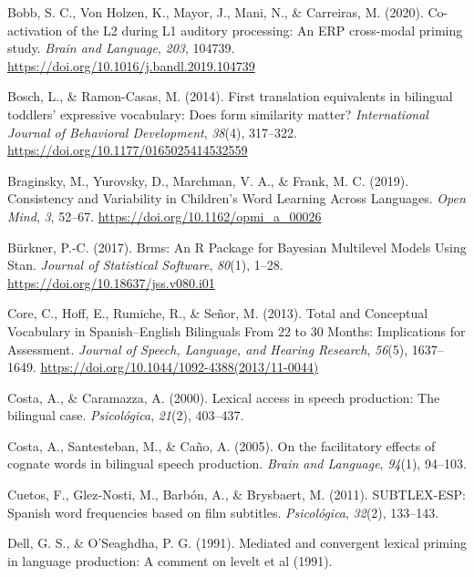 \documentclass[
  english,
  man,man,floatsintext]{apa6}
\newlength{\cslhangindent}
\newenvironment{cslreferences}%
  {\setlength{\parindent}{0pt}%
  \everypar{\setlength{\hangindent}{\cslhangindent}}\ignorespaces}%
  {\par}
\begin{document}
\begin{cslreferences}
\leavevmode\hypertarget{ref-bobb_co-activation_2020}{}%
Bobb, S. C., Von Holzen, K., Mayor, J., Mani, N., \& Carreiras, M. (2020). Co-activation of the L2 during L1 auditory processing: An ERP cross-modal priming study. \emph{Brain and Language}, \emph{203}, 104739. \url{https://doi.org/10.1016/j.bandl.2019.104739}

\leavevmode\hypertarget{ref-bosch_first_2014}{}%
Bosch, L., \& Ramon-Casas, M. (2014). First translation equivalents in bilingual toddlers' expressive vocabulary: Does form similarity matter? \emph{International Journal of Behavioral Development}, \emph{38}(4), 317--322. \url{https://doi.org/10.1177/0165025414532559}

\leavevmode\hypertarget{ref-braginsky_consistency_2019}{}%
Braginsky, M., Yurovsky, D., Marchman, V. A., \& Frank, M. C. (2019). Consistency and Variability in Children's Word Learning Across Languages. \emph{Open Mind}, \emph{3}, 52--67. \url{https://doi.org/10.1162/opmi_a_00026}

\leavevmode\hypertarget{ref-burkner_brms_2017}{}%
Bürkner, P.-C. (2017). Brms: An R Package for Bayesian Multilevel Models Using Stan. \emph{Journal of Statistical Software}, \emph{80}(1), 1--28. \url{https://doi.org/10.18637/jss.v080.i01}

\leavevmode\hypertarget{ref-core_total_2013}{}%
Core, C., Hoff, E., Rumiche, R., \& Señor, M. (2013). Total and Conceptual Vocabulary in Spanish--English Bilinguals From 22 to 30 Months: Implications for Assessment. \emph{Journal of Speech, Language, and Hearing Research}, \emph{56}(5), 1637--1649. \url{https://doi.org/10.1044/1092-4388(2013/11-0044)}

\leavevmode\hypertarget{ref-costa_lexical_2000}{}%
Costa, A., \& Caramazza, A. (2000). Lexical access in speech production: The bilingual case. \emph{Psicológica}, \emph{21}(2), 403--437.

\leavevmode\hypertarget{ref-costa_facilitatory_2005}{}%
Costa, A., Santesteban, M., \& Caño, A. (2005). On the facilitatory effects of cognate words in bilingual speech production. \emph{Brain and Language}, \emph{94}(1), 94--103.

\leavevmode\hypertarget{ref-cuetos_subtlex-esp_2011}{}%
Cuetos, F., Glez-Nosti, M., Barbón, A., \& Brysbaert, M. (2011). SUBTLEX-ESP: Spanish word frequencies based on film subtitles. \emph{Psicológica}, \emph{32}(2), 133--143.

\leavevmode\hypertarget{ref-dell_mediated_1991}{}%
Dell, G. S., \& O'Seaghdha, P. G. (1991). Mediated and convergent lexical priming in language production: A comment on levelt et al (1991).


\end{cslreferences}
\end{document}
